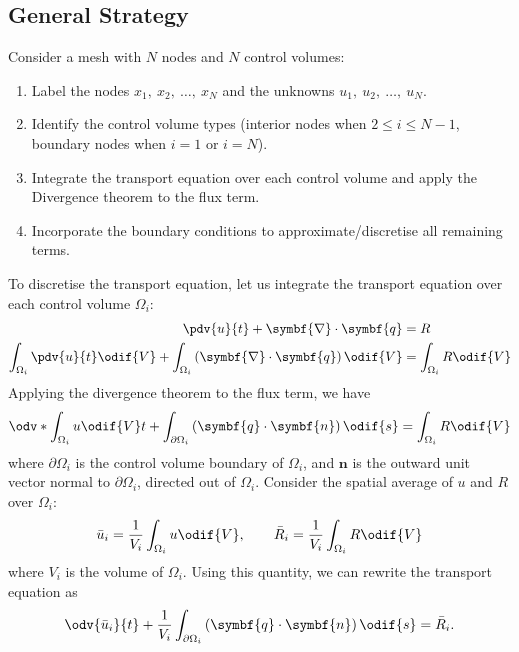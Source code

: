 \documentclass{article}
\begin{document}
\subsection{General Strategy}
Consider a mesh with \(N\) nodes and \(N\) control volumes:
\begin{enumerate}
    \item Label the nodes \(x_1,\: x_2,\: \ldots,\: x_N\) and the
          unknowns \(u_1,\: u_2,\: \ldots,\: u_N\).
    \item Identify the control volume types (interior nodes when \(2
          \leqslant i \leqslant N-1\), boundary nodes when \(i = 1\) or
          \(i = N\)).
    \item Integrate the transport equation over each control volume and
          apply the Divergence theorem to the flux term.
    \item Incorporate the boundary conditions to approximate/discretise
          all remaining terms.
\end{enumerate}
To discretise the transport equation, let us integrate the transport
equation over each control volume \(\Omega_i\):
\begin{align*}
    \pdv{u}{t} + \symbf{\nabla} \cdot \symbf{q}                                                                  & = R                          \\
    \int_{\Omega_i} \pdv{u}{t} \odif{V} + \int_{\Omega_i} \left( \symbf{\nabla} \cdot \symbf{q} \right) \odif{V} & = \int_{\Omega_i} R \odif{V}
\end{align*}
Applying the divergence theorem to the flux term, we have
\begin{equation*}
    \odv*{\int_{\Omega_i} u \odif{V}}{t} + \int_{\partial \Omega_i} \left( \symbf{q} \cdot \symbf{n} \right) \odif{s} = \int_{\Omega_i} R \odif{V}
\end{equation*}
where \(\partial \Omega_i\) is the control volume boundary of \(\Omega_i\),
and \(\symbf{n}\) is the outward unit vector normal to \(\partial \Omega_i\),
directed out of \(\Omega_i\). Consider the spatial average of \(u\) and
\(R\) over \(\Omega_i\):
\begin{equation*}
    \bar{u}_i = \frac{1}{V_i} \int_{\Omega_i} u \odif{V}, \qquad \bar{R}_i = \frac{1}{V_i} \int_{\Omega_i} R \odif{V}
\end{equation*}
where \(V_i\) is the volume of \(\Omega_i\). Using this quantity, we can
rewrite the transport equation as
\begin{equation*}
    \odv{\bar{u}_i}{t} + \frac{1}{V_i} \int_{\partial \Omega_i} \left( \symbf{q} \cdot \symbf{n} \right) \odif{s} = \bar{R}_i.
\end{equation*}
\end{document}
